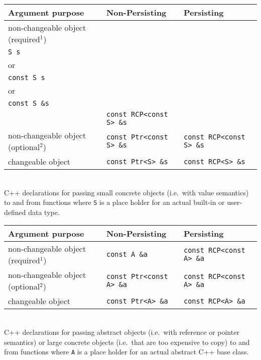 \documentclass[pdf,ps2pdf,11pt]{SANDreport}
\begin{document}
%
\begin{center}
\begin{minipage}{{}\textwidth}
\begin{tabular}{|l|l|l|}
\hline
Argument purpose
& Non-Persisting
& Persisting \\
\hline
\hline
non-changeable object (required$^1$)
& \begin{minipage}{12ex}
    {\tiny .}\\
    {}\texttt{S s} \\
    or \\
    {}\texttt{const S s} \\
    or \\
    {}\texttt{const S \&s} \\
  \end{minipage}
& {}\texttt{const RCP<const S> \&s} \\
\hline
non-changeable object (optional$^2$)
& {}\texttt{const Ptr<const S> \&s}
& {}\texttt{const RCP<const S> \&s} \\
\hline
changeable object
& {}\texttt{const Ptr<S> \&s}
& {}\texttt{const RCP<S> \&s} \\
\hline
\end{tabular}\\[2ex]
C++ declarations for passing small concrete objects (i.e.~with value
semantics) to and from functions where {}\texttt{S} is a place holder for an
actual built-in or user-defined data type.
\end{minipage}
\end{center}
%
%
\begin{center}
\begin{minipage}{{}\textwidth}
\begin{tabular}{|l|l|l|}
\hline
Argument purpose
& Non-Persisting
& Persisting \\
\hline
\hline
non-changeable object (required$^1$)
& {}\texttt{const A \&a}
& {}\texttt{const RCP<const A> \&a} \\
\hline
non-changeable object (optional$^2$)
& {}\texttt{const Ptr<const A> \&a}
& {}\texttt{const RCP<const A> \&a} \\
\hline
changeable object
& {}\texttt{const Ptr<A> \&a}
& {}\texttt{const RCP<A> \&a} \\
\hline
\end{tabular}\\[2ex]
C++ declarations for passing abstract objects (i.e.\ with reference or pointer
semantics) or large concrete objects (i.e.\ that are too expensive to copy) to
and from functions where {}\texttt{A} is a place holder for an actual abstract
C++ base class.
\end{minipage}
\end{center}
\end{document}
